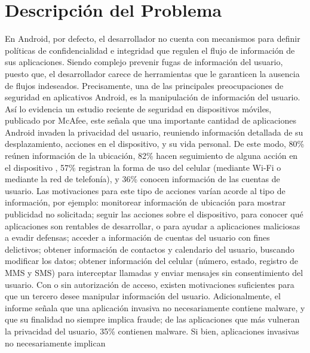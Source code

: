 \label{ch:problema}
\chapter{Descripción del Problema}

En Android, por defecto, el desarrollador no cuenta con mecanismos para
definir políticas de confidencialidad e integridad que regulen
el flujo de información de sus aplicaciones. Siendo complejo prevenir fugas de
información del usuario, puesto que, el desarrollador carece de herramientas que
le garanticen la ausencia de flujos indeseados.\newline
Precisamente, una de las principales preocupaciones de seguridad en aplicativos
Android, es la manipulación de información del usuario.
Así lo evidencia un
estudio reciente de seguridad en dispositivos móviles, publicado por
McAfee\cite{McAfeeReport}, este señala  que una importante cantidad de
aplicaciones Android invaden la privacidad del usuario, reuniendo información
detallada de su desplazamiento, acciones en el dispositivo, y su vida personal.
De este modo, 80\% reúnen información de la ubicación, 82\%
hacen seguimiento de alguna acción en el dispositivo , 57\%
registran la forma de uso del celular (mediante Wi-Fi o
mediante la red de telefonía), y 36\% conocen información de
las cuentas de usuario.\newline
Las motivaciones para este tipo de acciones varían acorde al tipo de
información, por ejemplo: monitorear información de ubicación para mostrar
publicidad no solicitada; seguir las acciones sobre el dispositivo, para conocer
qué aplicaciones son rentables de desarrollar, o para ayudar a aplicaciones
maliciosas a evadir defensas; acceder a información de cuentas del usuario con
fines delictivos; obtener información de contactos y calendario
del usuario, buscando modificar los datos; obtener información del celular 
(número, estado, registro de MMS y SMS) para interceptar llamadas y enviar
mensajes sin consentimiento del usuario.\newline
Con o sin autorización de acceso, existen motivaciones suficientes para que un
tercero desee manipular información del usuario.\newline
Adicionalmente, el informe señala que una aplicación invasiva no necesariamente
contiene malware, y que su finalidad no siempre implica fraude; de las
aplicaciones que más vulneran la privacidad del usuario, 35\% contienen
malware.\newline 
Si bien, aplicaciones invasivas no necesariamente implican
